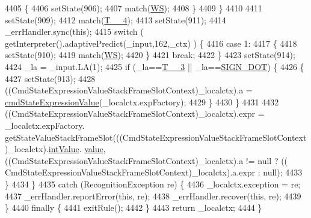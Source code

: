 \begin{DoxyCode}
4405         \{
4406         setState(906);
4407         match(\hyperlink{classgov_1_1nasa_1_1jpf_1_1inspector_1_1server_1_1expression_1_1parser_1_1_expression_grammar_parser_ace44714ae633c7b14794cc5a24d9ebf3}{WS});
4408         \}
4409       \}
4410 
4411       setState(909);
4412       match(\hyperlink{classgov_1_1nasa_1_1jpf_1_1inspector_1_1server_1_1expression_1_1parser_1_1_expression_grammar_parser_ae620c05745b7d42e86cfe3f8113e22d2}{T\_\_4});
4413       setState(911);
4414       \_errHandler.sync(\textcolor{keyword}{this});
4415       \textcolor{keywordflow}{switch} ( getInterpreter().adaptivePredict(\_input,162,\_ctx) ) \{
4416       \textcolor{keywordflow}{case} 1:
4417         \{
4418         setState(910);
4419         match(\hyperlink{classgov_1_1nasa_1_1jpf_1_1inspector_1_1server_1_1expression_1_1parser_1_1_expression_grammar_parser_ace44714ae633c7b14794cc5a24d9ebf3}{WS});
4420         \}
4421         \textcolor{keywordflow}{break};
4422       \}
4423       setState(914);
4424       \_la = \_input.LA(1);
4425       \textcolor{keywordflow}{if} (\_la==\hyperlink{classgov_1_1nasa_1_1jpf_1_1inspector_1_1server_1_1expression_1_1parser_1_1_expression_grammar_parser_a68f9589dcc3fc777455467ff010385ea}{T\_\_3} || \_la==\hyperlink{classgov_1_1nasa_1_1jpf_1_1inspector_1_1server_1_1expression_1_1parser_1_1_expression_grammar_parser_af578d1cac8553bcf6f52608a4e9125f1}{SIGN\_DOT}) \{
4426         \{
4427         setState(913);
4428         ((CmdStateExpressionValueStackFrameSlotContext)\_localctx).a = 
      \hyperlink{classgov_1_1nasa_1_1jpf_1_1inspector_1_1server_1_1expression_1_1parser_1_1_expression_grammar_parser_a9c38888905b31e514c2e4a695b8b2be6}{cmdStateExpressionValue}(\_localctx.expFactory);
4429         \}
4430       \}
4431 
4432        ((CmdStateExpressionValueStackFrameSlotContext)\_localctx).expr =  \_localctx.expFactory.
      getStateValueStackFrameSlot(((CmdStateExpressionValueStackFrameSlotContext)\_localctx).\hyperlink{classgov_1_1nasa_1_1jpf_1_1inspector_1_1server_1_1expression_1_1parser_1_1_expression_grammar_parser_a8c7e4b657a12e07efe3ea6429cb9cdcf}{intValue}.
      \hyperlink{classgov_1_1nasa_1_1jpf_1_1inspector_1_1server_1_1expression_1_1parser_1_1_expression_grammar_parser_1_1_int_value_context_a4c7175811f1802632486ad762d032ad5}{value}, ((CmdStateExpressionValueStackFrameSlotContext)\_localctx).a != null ? ((
      CmdStateExpressionValueStackFrameSlotContext)\_localctx).a.expr : null); 
4433       \}
4434     \}
4435     \textcolor{keywordflow}{catch} (RecognitionException re) \{
4436       \_localctx.exception = re;
4437       \_errHandler.reportError(\textcolor{keyword}{this}, re);
4438       \_errHandler.recover(\textcolor{keyword}{this}, re);
4439     \}
4440     \textcolor{keywordflow}{finally} \{
4441       exitRule();
4442     \}
4443     \textcolor{keywordflow}{return} \_localctx;
4444   \}
\end{DoxyCode}
